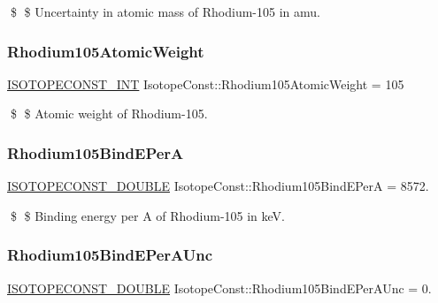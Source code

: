 \$ \$ Uncertainty in atomic mass of Rhodium-\/105 in amu. \mbox{\label{group___isotope_const-_rhodium-_rh105_ga498ef03291846392ca8a4f4e85d39c66}} 
\subsubsection{\texorpdfstring{Rhodium105\+Atomic\+Weight}{Rhodium105AtomicWeight}}
{\footnotesize\ttfamily \mbox{\hyperlink{group___isotope_const-_macros_ga5f18360b3e99483a35c32d789e62621c}{I\+S\+O\+T\+O\+P\+E\+C\+O\+N\+S\+T\+\_\+\+I\+NT}} Isotope\+Const\+::\+Rhodium105\+Atomic\+Weight = 105}

\$ \$ Atomic weight of Rhodium-\/105. \mbox{\label{group___isotope_const-_rhodium-_rh105_gab9de9b7c2d8447708585f7e8192c8ba7}} 
\subsubsection{\texorpdfstring{Rhodium105\+Bind\+E\+PerA}{Rhodium105BindEPerA}}
{\footnotesize\ttfamily \mbox{\hyperlink{group___isotope_const-_macros_ga8f45a7272ce02c0b4c65c44636ed719a}{I\+S\+O\+T\+O\+P\+E\+C\+O\+N\+S\+T\+\_\+\+D\+O\+U\+B\+LE}} Isotope\+Const\+::\+Rhodium105\+Bind\+E\+PerA = 8572.}

\$ \$ Binding energy per A of Rhodium-\/105 in keV. \mbox{\label{group___isotope_const-_rhodium-_rh105_ga073288919f6c875b1f19c9d3260292f2}} 
\subsubsection{\texorpdfstring{Rhodium105\+Bind\+E\+Per\+A\+Unc}{Rhodium105BindEPerAUnc}}
{\footnotesize\ttfamily \mbox{\hyperlink{group___isotope_const-_macros_ga8f45a7272ce02c0b4c65c44636ed719a}{I\+S\+O\+T\+O\+P\+E\+C\+O\+N\+S\+T\+\_\+\+D\+O\+U\+B\+LE}} Isotope\+Const\+::\+Rhodium105\+Bind\+E\+Per\+A\+Unc = 0.}

